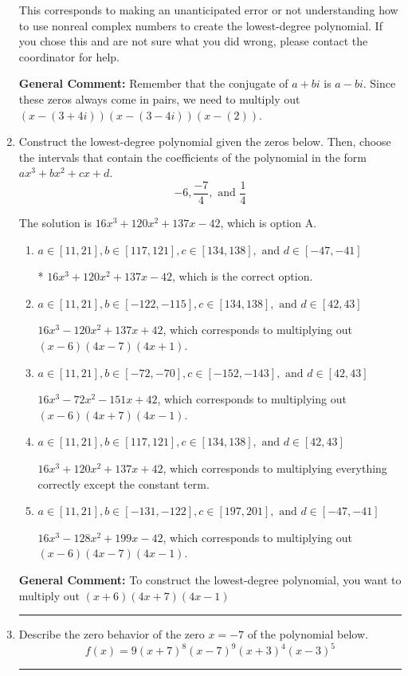 \documentclass{extbook}[14pt]
\newcommand{\litem}[1]{\item #1

\rule{\textwidth}{0.4pt}}
\begin{document}
\begin{enumerate}
{\begin{enumerate}[label=\Alph*.]
This corresponds to making an unanticipated error or not understanding how to use nonreal complex numbers to create the lowest-degree polynomial. If you chose this and are not sure what you did wrong, please contact the coordinator for help.
\end{enumerate}

\textbf{General Comment:} Remember that the conjugate of $a+bi$ is $a-bi$. Since these zeros always come in pairs, we need to multiply out $(x-(3 + 4 i))(x-(3 - 4 i))(x-(2))$.
}
\litem{
Construct the lowest-degree polynomial given the zeros below. Then, choose the intervals that contain the coefficients of the polynomial in the form $ax^3+bx^2+cx+d$.
\[ -6, \frac{-7}{4}, \text{ and } \frac{1}{4} \]

The solution is \( 16x^{3} +120 x^{2} +137 x -42 \), which is option A.\begin{enumerate}[label=\Alph*.]
\item \( a \in [11, 21], b \in [117, 121], c \in [134, 138], \text{ and } d \in [-47, -41] \)

* $16x^{3} +120 x^{2} +137 x -42$, which is the correct option.
\item \( a \in [11, 21], b \in [-122, -115], c \in [134, 138], \text{ and } d \in [42, 43] \)

$16x^{3} -120 x^{2} +137 x + 42$, which corresponds to multiplying out $(x -6)(4x -7)(4x + 1)$.
\item \( a \in [11, 21], b \in [-72, -70], c \in [-152, -143], \text{ and } d \in [42, 43] \)

$16x^{3} -72 x^{2} -151 x + 42$, which corresponds to multiplying out $(x -6)(4x + 7)(4x -1)$.
\item \( a \in [11, 21], b \in [117, 121], c \in [134, 138], \text{ and } d \in [42, 43] \)

$16x^{3} +120 x^{2} +137 x + 42$, which corresponds to multiplying everything correctly except the constant term.
\item \( a \in [11, 21], b \in [-131, -122], c \in [197, 201], \text{ and } d \in [-47, -41] \)

$16x^{3} -128 x^{2} +199 x -42$, which corresponds to multiplying out $(x -6)(4x -7)(4x -1)$.
\end{enumerate}

\textbf{General Comment:} To construct the lowest-degree polynomial, you want to multiply out $(x + 6)(4x + 7)(4x -1)$
}
\litem{
Describe the zero behavior of the zero $x = -7$ of the polynomial below.
\[ f(x) = 9(x + 7)^{8}(x - 7)^{9}(x + 3)^{4}(x - 3)^{5} \]

}
\end{enumerate}
\end{document}
